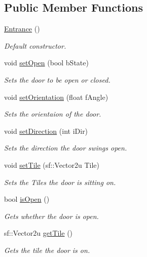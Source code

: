 \subsection*{Public Member Functions}
\begin{DoxyCompactItemize}
\item 
\hyperlink{class_entrance_a88cd27875093371afa47ac0f321716d7}{Entrance} ()
\begin{DoxyCompactList}\small\item\em Default constructor. \end{DoxyCompactList}\item 
void \hyperlink{class_entrance_a7cb1816675301f172ac6be0b874e5889}{set\+Open} (bool b\+State)
\begin{DoxyCompactList}\small\item\em Sets the door to be open or closed. \end{DoxyCompactList}\item 
void \hyperlink{class_entrance_a47595d251715bcc6367b09d5d2d112cc}{set\+Orientation} (float f\+Angle)
\begin{DoxyCompactList}\small\item\em Sets the orientaion of the door. \end{DoxyCompactList}\item 
void \hyperlink{class_entrance_a22dad184287d5fde6c8f04315798b9e6}{set\+Direction} (int i\+Dir)
\begin{DoxyCompactList}\small\item\em Sets the direction the door swings open. \end{DoxyCompactList}\item 
void \hyperlink{class_entrance_a9136eb4f03ad8243c814a94f49b66c4a}{set\+Tile} (sf\+::\+Vector2u Tile)
\begin{DoxyCompactList}\small\item\em Sets the Tiles the door is sitting on. \end{DoxyCompactList}\item 
bool \hyperlink{class_entrance_a619bfbe5db84833a122667e3c3be288e}{is\+Open} ()
\begin{DoxyCompactList}\small\item\em Gets whether the door is open. \end{DoxyCompactList}\item 
sf\+::\+Vector2u \hyperlink{class_entrance_a7f37b8990cf2926bfbcb9b3db36a23a2}{get\+Tile} ()
\begin{DoxyCompactList}\small\item\em Gets the tile the door is on. \end{DoxyCompactList}\end{DoxyCompactItemize}
